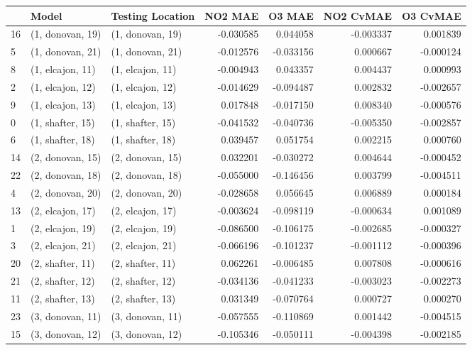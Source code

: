 \begin{tabular}{lllrrrr}
\toprule
{} &             Model &  Testing Location &   NO2 MAE &    O3 MAE &  NO2 CvMAE &  O3 CvMAE \\
\midrule
16 &  (1, donovan, 19) &  (1, donovan, 19) & -0.030585 &  0.044058 &  -0.003337 &  0.001839 \\
5  &  (1, donovan, 21) &  (1, donovan, 21) & -0.012576 & -0.033156 &   0.000667 & -0.000124 \\
8  &  (1, elcajon, 11) &  (1, elcajon, 11) & -0.004943 &  0.043357 &   0.004437 &  0.000993 \\
2  &  (1, elcajon, 12) &  (1, elcajon, 12) & -0.014629 & -0.094487 &   0.002832 & -0.002657 \\
9  &  (1, elcajon, 13) &  (1, elcajon, 13) &  0.017848 & -0.017150 &   0.008340 & -0.000576 \\
0  &  (1, shafter, 15) &  (1, shafter, 15) & -0.041532 & -0.040736 &  -0.005350 & -0.002857 \\
6  &  (1, shafter, 18) &  (1, shafter, 18) &  0.039457 &  0.051754 &   0.002215 &  0.000760 \\
14 &  (2, donovan, 15) &  (2, donovan, 15) &  0.032201 & -0.030272 &   0.004644 & -0.000452 \\
22 &  (2, donovan, 18) &  (2, donovan, 18) & -0.055000 & -0.146456 &   0.003799 & -0.004511 \\
4  &  (2, donovan, 20) &  (2, donovan, 20) & -0.028658 &  0.056645 &   0.006889 &  0.000184 \\
13 &  (2, elcajon, 17) &  (2, elcajon, 17) & -0.003624 & -0.098119 &  -0.000634 &  0.001089 \\
1  &  (2, elcajon, 19) &  (2, elcajon, 19) & -0.086500 & -0.106175 &  -0.002685 & -0.000327 \\
3  &  (2, elcajon, 21) &  (2, elcajon, 21) & -0.066196 & -0.101237 &  -0.001112 & -0.000396 \\
20 &  (2, shafter, 11) &  (2, shafter, 11) &  0.062261 & -0.006485 &   0.007808 & -0.000616 \\
21 &  (2, shafter, 12) &  (2, shafter, 12) & -0.034136 & -0.041233 &  -0.003023 & -0.002273 \\
11 &  (2, shafter, 13) &  (2, shafter, 13) &  0.031349 & -0.070764 &   0.000727 &  0.000270 \\
23 &  (3, donovan, 11) &  (3, donovan, 11) & -0.057555 & -0.110869 &   0.001442 & -0.004515 \\
15 &  (3, donovan, 12) &  (3, donovan, 12) & -0.105346 & -0.050111 &  -0.004398 & -0.002185 \\

\end{tabular}
